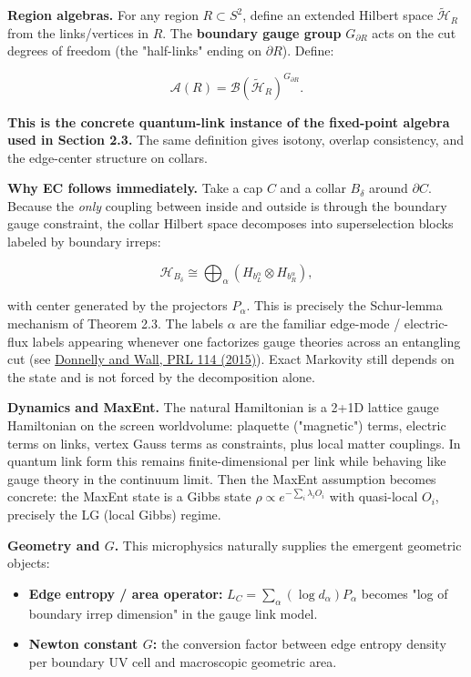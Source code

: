 \textbf{Region algebras.} For any region \(R \subset S^2\), define an extended Hilbert space \(\tilde{\mathcal{H}}_R\) from the links/vertices in \(R\). The \textbf{boundary gauge group} \(G_{\partial R}\) acts on the cut degrees of freedom (the "half-links" ending on \(\partial R\)). Define:

\[
\mathcal{A}(R) = \mathcal{B}(\tilde{\mathcal{H}}_R)^{G_{\partial R}}.
\]

\textbf{This is the concrete quantum-link instance of the fixed-point algebra used in Section 2.3.} The same definition gives isotony, overlap consistency, and the edge-center structure on collars.

\textbf{Why EC follows immediately.} Take a cap \(C\) and a collar \(B_\delta\) around \(\partial C\). Because the \emph{only} coupling between inside and outside is through the boundary gauge constraint, the collar Hilbert space decomposes into superselection blocks labeled by boundary irreps:

\[
\mathcal{H}_{B_\delta} \cong \bigoplus_\alpha (H_{b_L^\alpha} \otimes H_{b_R^\alpha}),
\]

with center generated by the projectors \(P_\alpha\). This is precisely the Schur-lemma mechanism of Theorem 2.3. The labels \(\alpha\) are the familiar edge-mode / electric-flux labels appearing whenever one factorizes gauge theories across an entangling cut (see \href{https://link.aps.org/doi/10.1103/PhysRevLett.114.111603}{Donnelly and Wall, PRL 114 (2015)}). Exact Markovity still depends on the state and is not forced by the decomposition alone.

\textbf{Dynamics and MaxEnt.} The natural Hamiltonian is a 2+1D lattice gauge Hamiltonian on the screen worldvolume: plaquette ("magnetic") terms, electric terms on links, vertex Gauss terms as constraints, plus local matter couplings. In quantum link form this remains finite-dimensional per link while behaving like gauge theory in the continuum limit. Then the MaxEnt assumption becomes concrete: the MaxEnt state is a Gibbs state \(\rho \propto e^{-\sum_i \lambda_i O_i}\) with quasi-local \(O_i\), precisely the LG (local Gibbs) regime.

\textbf{Geometry and \(G\).} This microphysics naturally supplies the emergent geometric objects:

\begin{itemize}
\tightlist
\item
  \textbf{Edge entropy / area operator:} \(L_C = \sum_\alpha (\log d_\alpha) P_\alpha\) becomes "log of boundary irrep dimension" in the gauge link model.
\item
  \textbf{Newton constant \(G\):} the conversion factor between edge entropy density per boundary UV cell and macroscopic geometric area.
\end{itemize}

